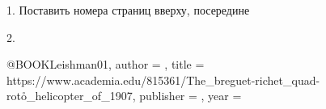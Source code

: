 \documentclass[a4paper,14pt,oneside,openany]{article}
\begin{document}
1. Поставить номера страниц вверху, посередине

2.

@BOOK{Leishman01,
	author = {},
	title = { https://www.academia.edu/815361/The\_breguet-richet\_quad-roto\r_helicopter\_of\_1907},
	publisher = {},
	year = {}
}
\end{document}
